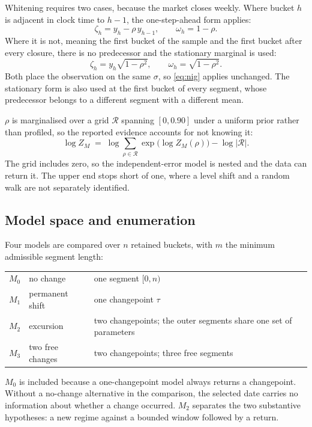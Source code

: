 \documentclass[11pt,a4paper]{article}
\begin{document}
Whitening requires two cases, because the market closes weekly. Where bucket $h$ is adjacent
in clock time to $h-1$, the one-step-ahead form applies:
\[
\zeta_h = y_h - \rho\, y_{h-1}, \qquad \omega_h = 1 - \rho .
\]
Where it is not, meaning the first bucket of the sample and the first bucket after every
closure, there is no predecessor and the stationary marginal is used:
\[
\zeta_h = y_h \sqrt{1-\rho^2}, \qquad \omega_h = \sqrt{1-\rho^2}.
\]
Both place the observation on the same $\sigma$, so \eqref{eq:nig} applies unchanged. The
stationary form is also used at the first bucket of every segment, whose predecessor belongs
to a different segment with a different mean.

$\rho$ is marginalised over a grid $\mathcal{R}$ spanning $[0, 0.90]$ under a uniform prior
rather than profiled, so the reported evidence accounts for not knowing it:
\[
\log Z_M \;=\; \log \sum_{\rho \in \mathcal{R}} \exp\bigl(\log Z_M(\rho)\bigr)
- \log|\mathcal{R}| .
\]
The grid includes zero, so the independent-error model is nested and the data can return it.
The upper end stops short of one, where a level shift and a random walk are not separately
identified.

\subsection{Model space and enumeration}

Four models are compared over $n$ retained buckets, with $m$ the minimum admissible segment
length:
\begin{center}
\begin{tabular}{@{}llp{7.4cm}@{}}
\toprule
$M_0$ & no change & one segment $[0,n)$ \\
$M_1$ & permanent shift & one changepoint $\tau$ \\
$M_2$ & excursion & two changepoints; the outer segments share one set of parameters \\
$M_3$ & two free changes & two changepoints; three free segments \\
\bottomrule
\end{tabular}
\end{center}

$M_0$ is included because a one-changepoint model always returns a changepoint. Without a
no-change alternative in the comparison, the selected date carries no information about
whether a change occurred. $M_2$ separates the two substantive hypotheses: a new regime
against a bounded window followed by a return.
\end{document}
